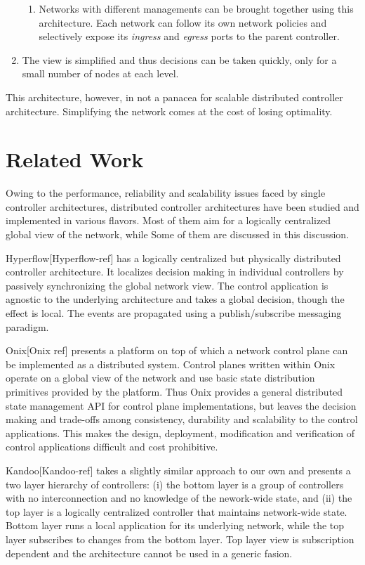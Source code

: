 \documentclass[10pt, twocolumn]{article}
\begin{document}
\begin{enumerate}
\begin{enumerate}
            \item Networks with different managements can be brought together using this architecture. Each network can follow its own network policies and selectively expose its \emph{ingress} and \emph{egress} ports to the parent controller.
        \end{enumerate}
    \item The view is simplified and thus decisions can be taken quickly, only for a small number of nodes at each level.
\end{enumerate}

This architecture, however, in not a panacea for scalable distributed controller architecture. Simplifying the network comes at the cost of losing optimality.

\section{Related Work}
\label{sec:related}
Owing to the performance, reliability and scalability issues faced by single controller architectures, distributed controller architectures have been studied and implemented in various flavors. Most of them aim for a logically centralized global view of the network, while Some of them are discussed in this discussion.

Hyperflow[Hyperflow-ref] has a logically centralized but physically distributed controller architecture. It localizes decision making in individual controllers by passively synchronizing the global network view. The control application is agnostic to the underlying architecture and takes a global decision, though the effect is local. The events are propagated using a publish/subscribe messaging paradigm.

Onix[Onix ref] presents a platform on top of which a network control plane can be implemented as a distributed system. Control planes written within Onix operate on a global view of the network and use basic state distribution primitives provided by the platform. Thus Onix provides a general distributed state management API for control plane implementations, but leaves the decision making and trade-offs among consistency, durability and scalability to the control applications. This makes the design, deployment, modification and verification of control applications difficult and cost prohibitive.

Kandoo[Kandoo-ref] takes a slightly similar approach to our own and presents a two layer hierarchy of controllers: (i) the bottom layer is a group of controllers with no interconnection and no knowledge of the nework-wide state, and (ii) the top layer is a logically centralized controller that maintains network-wide state. Bottom layer runs a local application for its underlying network, while the top layer subscribes to changes from the bottom layer. Top layer view is subscription dependent and the architecture cannot be used in a generic fasion.
\end{document}
